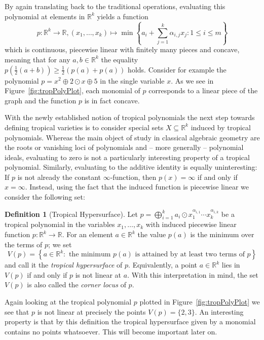 \documentclass[
  paper=a4,
  titlepage,
  bibliography=totoc,
  listof=totoc,
  pagesize=pdftex
]{scrartcl}
\numberwithin{figure}{section}
\numberwithin{equation}{section}
\numberwithin{table}{section}
\newcommand*\setR{\mathds{R}}
\theoremstyle{definition}
\newtheorem{definition}{Definition}
\numberwithin{definition}{section}
\begin{document}
By again translating back to the traditional operations, evaluating this polynomial at
elements in $\setR^k$ yields a function
\[
  p : \setR^k \to \setR, (x_1, \dots, x_k) \mapsto
  \min\left\{
    a_i + \sum_{j=1}^k \alpha_{i,j}x_j : 1 \leq i \leq m
  \right\}
\]
which is continuous, piecewise linear with finitely many pieces and concave, meaning that
for any $a,b \in \setR^k$ the equality $p(\frac12(a+b)) \geq \frac12(p(a)+p(a))$ holds.
Consider for example the polynomial $p = x^2 \oplus 2\odot x \oplus 5$ in the single
variable $x$. As we see in Figure~\ref{fig:tropPolyPlot}, each monomial of $p$ corresponds
to a linear piece of the graph and the function $p$ is in fact concave.

With the newly established notion of tropical polynomials the next step towards defining
tropical varieties is to consider special sets $X \subseteq \setR^k$ induced by tropical
polynomials. Whereas the main object of study in classical algebraic geometry are the
roots or vanishing loci of polynomials and -- more generally -- polynomial ideals,
evaluating to zero is not a particularly interesting property of a tropical polynomial.
Similarly, evaluating to the additive identity is equally uninteresting: If $p$ is not
already the constant $\infty$-function, then $p(x)=\infty$ if and only if $x=\infty$.
Instead, using the fact that the induced function is piecewise linear we consider the
following set:

\begin{definition}[Tropical Hypersurface]
  \label{def:tropHypersurface}
  Let $p = \bigoplus_{i=1}^k a_i \odot x_1^{\alpha_{i,1}}\cdots x_k^{\alpha_{i,k}}$ be a
  tropical polynomial in the variables $x_1, \dots, x_k$ with induced piecewise linear
  function $p:\setR^k \to \setR$. For an element $a\in \setR^k$ the value $p(a)$ is the
  minimum over the terms of $p$; we set
  \[
    V(p) = \left\{
      a \in \setR^k :
      \text{ the minimum $p(a)$ is attained by at least two terms of $p$}
    \right\}
  \]
  and call it the \emph{tropical hypersurface} of $p$. Equivalently, a point $a\in
  \setR^k$ lies in $V(p)$ if and only if $p$ is not linear at $a$. With this
  interpretation in mind, the set $V(p)$ is also called the \emph{corner locus} of $p$.
\end{definition}

Again looking at the tropical polynomial $p$ plotted in Figure~\ref{fig:tropPolyPlot} we
see that $p$ is not linear at precisely the points $V(p) = \{ 2, 3 \}$. An interesting
property is that by this definition the tropical hypersurface given by a monomial contains
no points whatsoever. This will become important later on.
\end{document}
